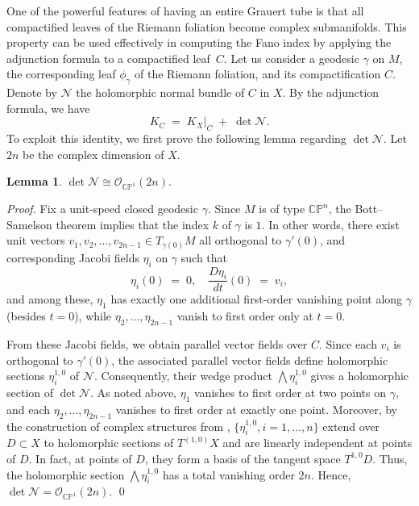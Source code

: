 \documentclass[a4paper, 12pt]{article}
\newcommand{\oX}{X}
\newcommand{\bCP}{\mathbb{CP}^n}
\newcommand{\cO}{\mathcal{O}}
\newcommand{\cN}{\mathcal{N}}
\newtheorem{lem}[thm]{Lemma}
\begin{document}
One of the powerful features of having an entire Grauert tube is that all compactified leaves of the Riemann foliation become complex submanifolds. This property can be used effectively in computing the Fano index by applying the adjunction formula to a compactified leaf~\(C\). Let us consider a geodesic \(\gamma\) on \(M\), the corresponding leaf \(\phi_\gamma\) of the Riemann foliation, and its compactification \(C\). Denote by \(\cN\) the holomorphic normal bundle of \(C\) in \(\oX\). By the adjunction formula, we have
\[
K_C \;=\; K_{\oX}\bigl|_{C} \;+\;\det \cN.
\]
To exploit this identity, we first prove the following lemma regarding \(\det \cN\). Let $2n$ be the complex dimension of $\oX$.

\begin{lem}\label{normal}
\(\det \cN \cong \cO_{\mathbb{CP}^1}(2n).\)
\end{lem}

\noindent\textit{Proof.}
Fix a unit-speed closed geodesic \(\gamma\). Since \(M\) is of type \(\bCP\), the Bott--Samelson theorem implies that the index \(k\) of \(\gamma\) is \(1\). In other words, there exist unit vectors \(v_1,v_2,\ldots,v_{2n-1}\in T_{\gamma(0)}M\) all orthogonal to \(\gamma'(0)\), and corresponding Jacobi fields \(\eta_i\) on \(\gamma\) such that
\[
\eta_i(0) \;=\; 0,
\quad
\frac{D\eta_i}{dt}(0)\;=\;v_i,
\]
and among these, \(\eta_1\) has exactly one additional first-order vanishing point along \(\gamma\) (besides \(t=0\)), while \(\eta_2,\ldots,\eta_{2n-1}\) vanish to first order only at \(t=0\).

From these Jacobi fields, we obtain parallel vector fields over \(C\). Since each \(v_i\) is orthogonal to \(\gamma'(0)\), the associated parallel vector fields define holomorphic sections \(\eta_i^{1,0}\) of \(\cN\). Consequently, their wedge product \(\bigwedge\eta_i^{1,0}\) gives a holomorphic section of \(\det \cN\). As noted above, \(\eta_1\) vanishes to first order at two points on \(\gamma\), and each \(\eta_2,\ldots,\eta_{2n-1}\) vanishes to first order at exactly one point. Moreover, by the construction of complex structures from \cite{BL18}, $\{\eta_i^{1,0}, i=1,\dots, n\}$ extend over $D\subset X$ to holomorphic sections of $T^{(1,0)}X$ and are linearly independent at points of $D$. In fact, at points of $D$, they form a basis of the tangent space $T^{1,0}D$. 
Thus, the holomorphic section \(\bigwedge \eta_i^{1,0}\) has a total vanishing order \(2n\). Hence, \(\det \cN = \cO_{\mathbb{CP}^1}(2n)\). 
\qed
\end{document}
